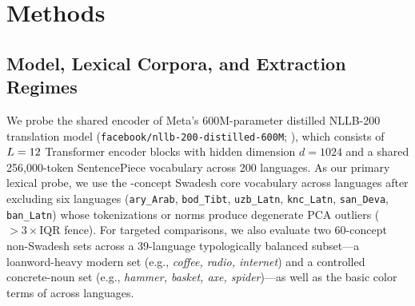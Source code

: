 \section{Methods}
\label{sec:methods}

\subsection{Model, Lexical Corpora, and Extraction Regimes}

We probe the shared encoder of Meta's 600M-parameter distilled NLLB-200 translation model (\texttt{facebook/nllb-200-distilled-600M}; \citealp{nllbteam2022}), which consists of $L = 12{}$ Transformer encoder blocks with hidden dimension $d = 1024$ and a shared 256,000-token SentencePiece vocabulary across 200 languages.
As our primary lexical probe, we use the \NumConcepts{}-concept Swadesh core vocabulary \citep{swadesh1952} across \NumLanguages{} languages after excluding six languages (\texttt{ary\_Arab}, \texttt{bod\_Tibt}, \texttt{uzb\_Latn}, \texttt{knc\_Latn}, \texttt{san\_Deva}, \texttt{ban\_Latn}) whose tokenizations or norms produce degenerate PCA outliers ($>3\times\text{IQR}$ fence).
For targeted comparisons, we also evaluate two 60-concept non-Swadesh sets across a 39-language typologically balanced subset—a loanword-heavy modern set (e.g., \emph{coffee, radio, internet}) and a controlled concrete-noun set (e.g., \emph{hammer, basket, axe, spider})—as well as the \ColorNumColors{} basic color terms of \citet{berlin1969} across \ColorNumLanguages{} languages.

